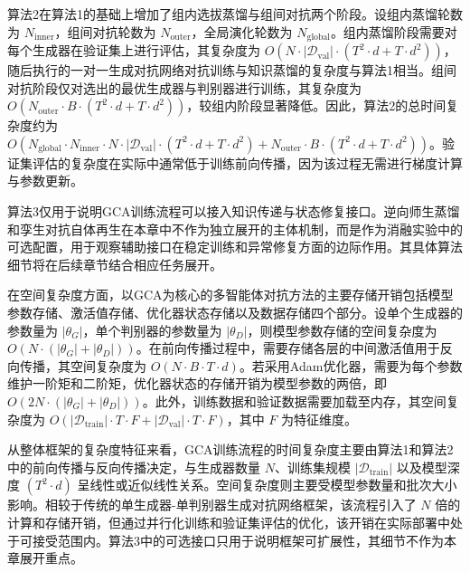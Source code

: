 算法2在算法1的基础上增加了组内选拔蒸馏与组间对抗两个阶段。设组内蒸馏轮数为 $N_{\text{inner}}$，组间对抗轮数为 $N_{\text{outer}}$，全局演化轮数为 $N_{\text{global}}$。组内蒸馏阶段需要对每个生成器在验证集上进行评估，其复杂度为 $O(N \cdot |\mathcal{D}_{\text{val}}| \cdot (T^2 \cdot d + T \cdot d^2))$，随后执行的一对一生成对抗网络对抗训练与知识蒸馏的复杂度与算法1相当。组间对抗阶段仅对选出的最优生成器与判别器进行训练，其复杂度为 $O(N_{\text{outer}} \cdot B \cdot (T^2 \cdot d + T \cdot d^2))$，较组内阶段显著降低。因此，算法2的总时间复杂度约为 $O(N_{\text{global}} \cdot N_{\text{inner}} \cdot N \cdot |\mathcal{D}_{\text{val}}| \cdot (T^2 \cdot d + T \cdot d^2) + N_{\text{outer}} \cdot B \cdot (T^2 \cdot d + T \cdot d^2))$。验证集评估的复杂度在实际中通常低于训练前向传播，因为该过程无需进行梯度计算与参数更新。

算法3仅用于说明GCA训练流程可以接入知识传递与状态修复接口。逆向师生蒸馏和孪生对抗自体再生在本章中不作为独立展开的主体机制，而是作为消融实验中的可选配置，用于观察辅助接口在稳定训练和异常修复方面的边际作用。其具体算法细节将在后续章节结合相应任务展开。

在空间复杂度方面，以GCA为核心的多智能体对抗方法的主要存储开销包括模型参数存储、激活值存储、优化器状态存储以及数据存储四个部分。设单个生成器的参数量为 $|\theta_G|$，单个判别器的参数量为 $|\theta_D|$，则模型参数存储的空间复杂度为 $O(N \cdot (|\theta_G| + |\theta_D|))$。在前向传播过程中，需要存储各层的中间激活值用于反向传播，其空间复杂度为 $O(N \cdot B \cdot T \cdot d)$。若采用Adam优化器，需要为每个参数维护一阶矩和二阶矩，优化器状态的存储开销为模型参数的两倍，即 $O(2N \cdot (|\theta_G| + |\theta_D|))$。此外，训练数据和验证数据需要加载至内存，其空间复杂度为 $O(|\mathcal{D}_{\text{train}}| \cdot T \cdot F + |\mathcal{D}_{\text{val}}| \cdot T \cdot F)$，其中 $F$ 为特征维度。

从整体框架的复杂度特征来看，GCA训练流程的时间复杂度主要由算法1和算法2中的前向传播与反向传播决定，与生成器数量 $N$、训练集规模 $|\mathcal{D}_{\text{train}}|$ 以及模型深度 $(T^2 \cdot d)$ 呈线性或近似线性关系。空间复杂度则主要受模型参数量和批次大小影响。相较于传统的单生成器-单判别器生成对抗网络框架，该流程引入了 $N$ 倍的计算和存储开销，但通过并行化训练和验证集评估的优化，该开销在实际部署中处于可接受范围内。算法3中的可选接口只用于说明框架可扩展性，其细节不作为本章展开重点。








